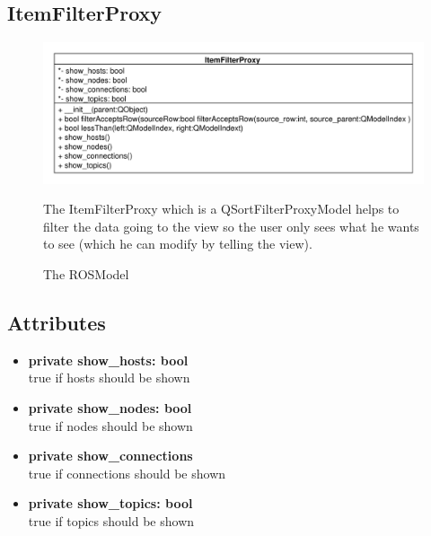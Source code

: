 \subsection{ItemFilterProxy}
\begin{figure}[htbp]
	\begin{minipage}[t]{7cm}
		\vspace{0pt}
		\centering
		\includegraphics[scale=0.6]{./diagram_pictures/ItemFilter.pdf}
		\caption{The ROSModel}
	\end{minipage}
	\hfill
	\begin{minipage}[t]{8cm}
		\vspace{10pt}
		The ItemFilterProxy which is a QSortFilterProxyModel helps to filter the data going to the view so the user only sees what he wants to see (which he can modify by telling the view). 
	\end{minipage}
\end{figure} 
\subsection{Attributes}
\begin{itemize}
  \item \textbf{private show\_hosts: bool}\\
  true if hosts should be shown
  \item \textbf{private show\_nodes: bool}\\
  true if nodes should be shown
  \item \textbf{private show\_connections}\\
  true if connections should be shown
  \item \textbf{private show\_topics: bool}\\
  true if topics should be shown
\end{itemize}
